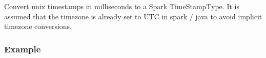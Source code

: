 \documentclass[a4paper,10pt, twoside,english]{sphinxmanual}
\begin{document}

\begin{fulllineitems}
\label{\detokenize{transformer/mapper:spooq2.transformer.mapper_custom_data_types._generate_select_expression_for_unix_timestamp_ms_to_spark_timestamp}}
Convert unix timestamps in milliseconds to a Spark TimeStampType. It is assumed that the
timezone is already set to UTC in spark / java to avoid implicit timezone conversions.
\subsubsection*{Example}


\end{fulllineitems}
\end{document}
